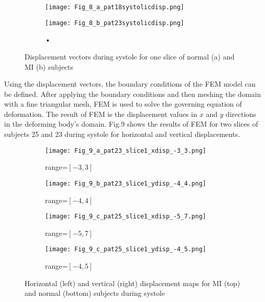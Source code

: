 \documentclass{jicspack}
\begin{document}
\begin{figure}
\centering
\begin{subfigure}[b]{.4\textwidth}
\texttt{[image: Fig\_8\_a\_pat18systolicdisp.png]}
\caption{}
\end{subfigure}
\begin{subfigure}[b]{0.4\textwidth}
\texttt{[image: Fig\_8\_b\_pat23systolicdisp.png]}
\caption{•}
\end{subfigure}
\caption{Displacement vectors during systole for one slice of normal (a) and MI (b) subjects}
\end{figure}

Using the displacement vectors, the boundary conditions of the FEM model can be defined.
After applying the boundary conditions and then meshing the domain with a fine triangular mesh, FEM is used to solve the governing equation of deformation. The result of FEM is the displacement values in $x$ and $y$ directions in the deforming body's domain. Fig.9 shows the results of FEM for two slices of subjects 25 and 23 during systole for horizontal and vertical displacements. 

\begin{figure}
\centering
\begin{subfigure}[b]{.45\textwidth}
\texttt{[image: Fig\_9\_a\_pat23\_slice1\_xdisp\_-3\_3.png]}
\caption{range=$[-3, 3]$}
\end{subfigure}
\begin{subfigure}[b]{0.45\textwidth}
\texttt{[image: Fig\_9\_b\_pat23\_slice1\_ydisp\_-4\_4.png]}
\caption{range=$[-4, 4]$}
\end{subfigure}

\begin{subfigure}[b]{.45\textwidth}
\texttt{[image: Fig\_9\_c\_pat25\_slice1\_xdisp\_-5\_7.png]}
\caption{range=$[-5, 7]$}
\end{subfigure}
\begin{subfigure}[b]{0.45\textwidth}
\texttt{[image: Fig\_9\_c\_pat25\_slice1\_ydisp\_-4\_5.png]}
\caption{range=$[-4, 5]$}
\end{subfigure}
\caption{Horizontal (left) and vertical (right) displacement maps for MI (top) and normal (bottom) subjects during systole}
\end{figure}
\end{document}
